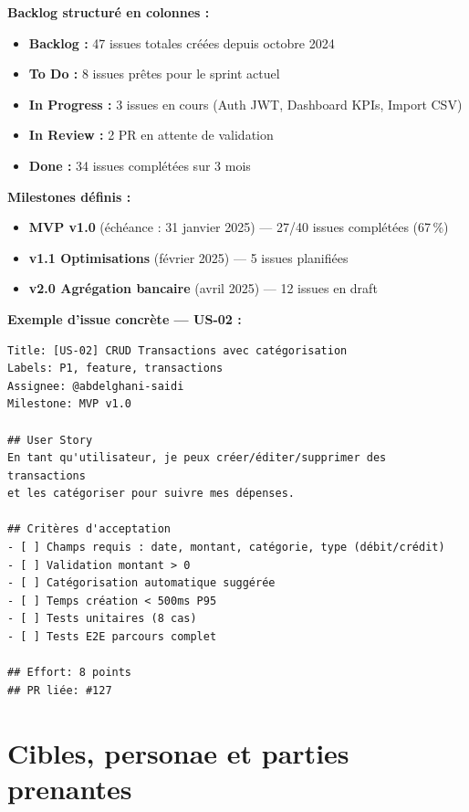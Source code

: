 \begin{tcolorbox}[colback=yellow!5!white,colframe=yellow!60!black,title=\textbf{Organisation GitHub Projects — Données réelles}]
\textbf{Backlog structuré en colonnes :}
\begin{itemize}
    \item \textbf{Backlog :} 47 issues totales créées depuis octobre 2024
    \item \textbf{To Do :} 8 issues prêtes pour le sprint actuel
    \item \textbf{In Progress :} 3 issues en cours (Auth JWT, Dashboard KPIs, Import CSV)
    \item \textbf{In Review :} 2 PR en attente de validation
    \item \textbf{Done :} 34 issues complétées sur 3 mois
\end{itemize}

\textbf{Milestones définis :}
\begin{itemize}
    \item \textbf{MVP v1.0} (échéance : 31 janvier 2025) — 27/40 issues complétées (67\,\%)
    \item \textbf{v1.1 Optimisations} (février 2025) — 5 issues planifiées
    \item \textbf{v2.0 Agrégation bancaire} (avril 2025) — 12 issues en draft
\end{itemize}

\textbf{Exemple d'issue concrète — US-02 :}
\begin{verbatim}
Title: [US-02] CRUD Transactions avec catégorisation
Labels: P1, feature, transactions
Assignee: @abdelghani-saidi
Milestone: MVP v1.0

## User Story
En tant qu'utilisateur, je peux créer/éditer/supprimer des transactions
et les catégoriser pour suivre mes dépenses.

## Critères d'acceptation
- [ ] Champs requis : date, montant, catégorie, type (débit/crédit)
- [ ] Validation montant > 0
- [ ] Catégorisation automatique suggérée
- [ ] Temps création < 500ms P95
- [ ] Tests unitaires (8 cas)
- [ ] Tests E2E parcours complet

## Effort: 8 points
## PR liée: #127
\end{verbatim}
\end{tcolorbox}

\section{Cibles, personae et parties prenantes}

